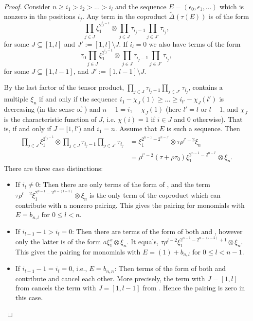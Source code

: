 \documentclass[11pt,hyp]{nyjm}
\newcommand{\tensor}{\otimes}
\newcommand{\DeltaT}{\widetilde{\Delta}}
\theoremstyle{theoremstyle}
\theoremstyle{definition}
\theoremstyle{theoremstyle}
\begin{document}
\begin{proof}
  Consider $n \geq i_1 > i_2 > \dots > i_l$ and the sequence $E = (\epsilon_0, \epsilon_1, \dots)$ which is nonzero in the positions $i_j$.
  Any term in the coproduct $\DeltaT(\tau(E))$ is of the form
  \begin{equation}
    \label{term1}
    \prod_{j \in J} \xi_{1}^{2^{{i_j}-1}} \tensor \prod_{j \in J} \tau_{i_j - 1} \prod_{j \in J'} \tau_{i_j},
  \end{equation}
  for some $J \subseteq [1, l]$ and $J' := [1, l]\setminus J$.
  If $i_l=0$ we also have terms of the form
  \begin{equation}
    \label{term2}
    \tau_0 \prod_{j \in J} \xi_{1}^{2^{{i_j}-1}} \tensor \prod_{j \in J} \tau_{i_j - 1} \prod_{j \in J'} \tau_{i_j},
  \end{equation}
  for some $J \subseteq [1, l-1]$, and $J' := [1, l-1]\setminus J$.

  By  the last factor of the tensor product,
  $\prod_{j \in J} \tau_{i_j - 1} \prod_{j \in J'} \tau_{i_j}$,
  contains a multiple $\xi_n$ if and only if 
  the sequence $i_1 - \chi_J(1) \geq \dots \geq i_{l'} - \chi_J(l')$ is decreasing (in the sense of ) and $n-1 = i_1 - \chi_J(1)$
  (here $l' = l$ or $l-1$, and $\chi_J$ is the characteristic function of $J$, i.e. $\chi(i) = 1$ if $i \in J$ and 0 otherwise).
  That is, if and only if $J = [1, l')$ and $i_1 = n$. Assume that $E$ is such a sequence.
  Then
  \begin{align*}
  \prod_{j \in J} \xi_{1}^{2^{{i_j}-1}} \tensor \prod_{j \in J} \tau_{i_j - 1} \prod_{j \in J'} \tau_{i_j}
  &=
  \xi_1^{2^{n-1} - 2^{n - l'}} \tensor \tau \rho^{l' - 2}\xi_n \\
  &=
  \rho^{l'-2}(\tau + \rho\tau_0)\xi_1^{2^{n-1} - 2^{n - l'}} \tensor \xi_n.
  \end{align*}
  There are three case distinctions:
  \begin{itemize}
    \item If $i_l \neq 0$: Then there are only terms of the form of , and
      the term $\tau\rho^{l-2}\xi_1^{2^{n-1} - 2^{n - (l-1)}} \tensor \xi_n$ is the only term of the coproduct
      which can contribute with a nonzero pairing.
      This gives the pairing for monomials with $E = b_{n,l}$ for $0 \leq l < n$.
    \item If $i_{l-1} - 1 > i_l = 0$: Then there are terms of the form of both  and ,
      however only the latter is of the form $a\xi_1^x \tensor \xi_n$. It equals,
      $\tau\rho^{l-2}\xi_1^{2^{n-1} - 2^{n - (l-2)}+1} \tensor \xi_n$.
      This gives the pairing for monomials with  $E = (1) + b_{n, l}$ for $0 \leq l < n-1$.
    \item If $i_{l-1} - 1 = i_l = 0$, i.e., $E = b_{n, n}$:
      Then terms of the form of both  and  contribute and cancel each other.
      More precisely, the term with $J=[1, l]$ from  cancels the term with $J=[1, l-1]$ from .
      Hence the pairing is zero in this case.
  \end{itemize}
\end{proof}
\end{document}
